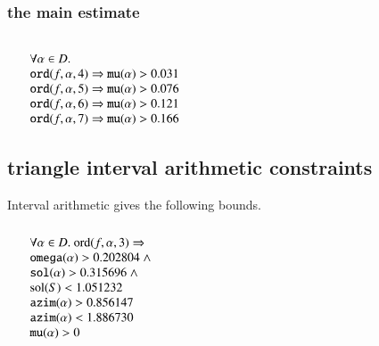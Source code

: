\subsubsection{the main estimate}
$$
\begin{array}{lll}
\leftalign\\
\forall \alpha\in D.\\
   \optt{ord}(f,\alpha,4) \Rightarrow
   \optt{mu}(\alpha) > 0.031 \\
   \optt{ord}(f,\alpha,5) \Rightarrow
   \optt{mu}(\alpha) > 0.076 \\
   \optt{ord}(f,\alpha,6) \Rightarrow
   \optt{mu}(\alpha) > 0.121 \\
   \optt{ord}(f,\alpha,7) \Rightarrow
   \optt{mu}(\alpha) > 0.166 \\
\end{array}
$$




\subsection{triangle interval arithmetic constraints}\label{sec:tri}

Interval arithmetic gives the following bounds.
$$
\begin{array}{lll}
\leftalign\\
  \forall \alpha\in D. \ \op{ord}(f,\alpha,3) 
   \Rightarrow \\ 
      \optt{omega}(\alpha) > 0.202804  \sland \\
   \optt{sol}(\alpha) > 0.315696 \sland \\
   \sol(S) < 1.051232\\
   \optt{azim}(\alpha) > 0.856147\\
   \optt{azim}(\alpha) < 1.886730\\
   \optt{mu}(\alpha) > 0
\end{array}
$$


